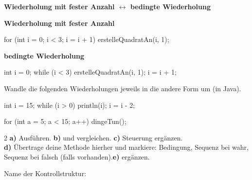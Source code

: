 \documentclass[11pt,a4paper]{article}
\begin{document}
\newpage
\textbf{Wiederholung mit fester Anzahl $\leftrightarrow$ bedingte Wiederholung}

\begin{minipage}[t]{0.48\linewidth}
\textbf{Wiederholung mit fester Anzahl}
\begin{java}
for (int i = 0; i < 3; i = i + 1)
{
   erstelleQuadratAn(i, 1);
}
\end{java}
\end{minipage}\hfill
\begin{minipage}[t]{0.48\linewidth}
\textbf{bedingte Wiederholung}
\begin{java}
int i = 0;
while (i < 3)
{
   erstelleQuadratAn(i, 1);
   i = i + 1;
}
\end{java}
\end{minipage}

Wandle die folgenden Wiederholungen jeweils in die andere Form um (in Java).

\begin{minipage}[t]{0.48\linewidth}
\begin{java}
int i = 15;
while (i > 0) {
   println(i);
   i = i - 2;
}
\end{java}
\end{minipage}\hfill
\begin{minipage}[t]{0.48\linewidth}
\vspace{2mm}
\end{minipage}

\begin{minipage}[t]{0.48\linewidth}
\begin{java}
for (int a = 5; a < 15; a++) {
   dingeTun();
}
\end{java}
\end{minipage}\hfill
\begin{minipage}[t]{0.48\linewidth}
\vspace{2mm}
\end{minipage}

\begin{aufgabe}{2}
\textbf{a)} Ausführen. \quad \textbf{b)}  und  vergleichen. \quad \textbf{c)} Steuerung ergänzen.\\
\textbf{d)} Übertrage deine Methode  hierher und markiere: Bedingung, Sequenz bei wahr, Sequenz bei falsch (falls vorhanden).\quad \textbf{e)}  ergänzen.
\end{aufgabe}
Name der Kontrollstruktur: 
\end{document}
